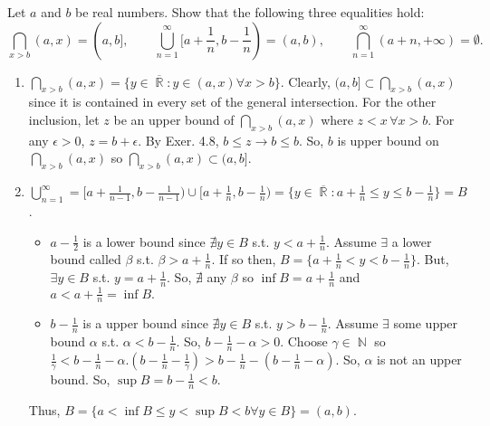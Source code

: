\documentclass[12pt,letterpaper,boxed]{hmcpset}
\DeclareMathOperator{\R}{\mathbb{R}}
\DeclareMathOperator{\N}{\mathbb{N}}
\begin{document}

\begin{problem}[Exercise 5.4.]
Let $a$ and $b$ be real numbers. Show that the following three equalities hold: $$\bigcap_{x > b}(a,x) = (a,b], \quad \quad \bigcup_{n=1}^{\infty}[a + \frac{1}{n}, b - \frac{1}{n})=(a,b), \quad \quad \bigcap_{n = 1}^{\infty}(a + n,+\infty) = \emptyset.$$
\end{problem}


\begin{solution}
\begin{enumerate}
	\itemsep0em
	\item $\bigcap_{x > b}(a,x) = \{y \in \overline{\R} : y \in (a, x) \forall x > b\}$. Clearly, $(a,b]\subset \bigcap_{x > b}(a,x)$ since it is contained in every set of the general intersection. For the other inclusion, let $z$ be an upper bound of $\bigcap_{x > b}(a,x)$ where $z < x \, \forall x > b$. For any $\epsilon > 0$, $z = b + \epsilon$. By Exer. 4.8, $b \leq z \rightarrow b \leq b.$ So, $b$ is upper bound on $\bigcap_{x > b}(a,x)$ so $\bigcap_{x > b}(a,x)\subset (a,b].$
	\item $\bigcup_{n=1}^{\infty} = [a + \frac{1}{n - 1}, b - \frac{1}{n - 1}) \cup [a + \frac{1}{n}, b - \frac{1}{n}) = \{ y \in \overline{\R} : a + \frac{1}{n} \leq y \leq b - \frac{1}{n} \} = B$.
	\vspace{-2mm}
	\begin{itemize}
		\itemsep0em
		\item $a - \frac{1}{2}$ is a lower bound since $\nexists y \in B$ s.t. $y < a + \frac{1}{n}$. Assume $\exists$ a lower bound called $\beta$ s.t. $\beta > a + \frac{1}{n}.$ If so then, $B = \{a + \frac{1}{n} < y < b - \frac{1}{n} \}.$ But, $\exists y\in B$ s.t. $y = a + \frac{1}{n}.$ So, $\nexists $ any $\beta$ so $\inf B = a + \frac{1}{n}$ and $a < a + \frac{1}{n}=\inf B.$ 
		\item $b - \frac{1}{n}$ is a upper bound since $\nexists y \in B$ s.t. $y > b - \frac{1}{n}$. Assume $\exists$ some upper bound $\alpha$ s.t. $\alpha < b - \frac{1}{n}.$ So, $b - \frac{1}{n} - \alpha > 0.$ Choose $\gamma \in \N$ so $\frac{1}{\gamma} < b - \frac{1}{n} - \alpha. (b - \frac{1}{n} - \frac{1}{\gamma}) > b - \frac{1}{n} - (b - \frac{1}{n} - \alpha).$ So, $\alpha$ is not an upper bound. So, $\sup B = b - \frac{1}{n} < b.$ 
	\end{itemize} 
	Thus, $B = \{a < \inf B \leq y < \sup B < b \forall y \in B\} = (a,b)$.

\end{enumerate}
\end{solution}
\end{document}
